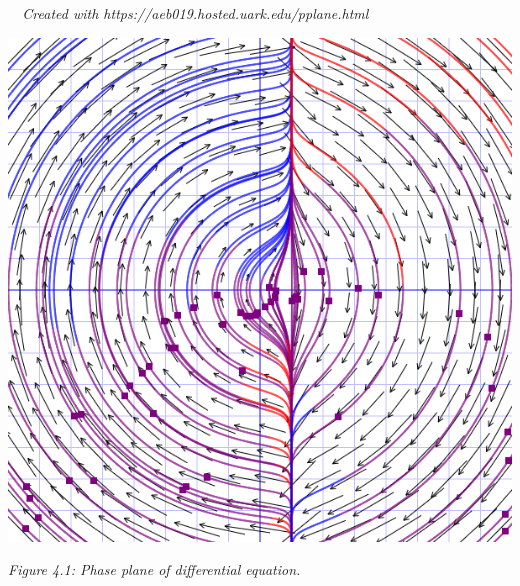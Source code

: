 \documentclass[11pt]{article}
\begin{document}
    \begin{problem}\textit{$\text{ }$ \newline Created with https://aeb019.hosted.uark.edu/pplane.html}
        \begin{center}
            \includegraphics[scale=0.3]{41.png}
        \end{center}
        \begin{center}
            \textit{Figure 4.1: Phase plane of differential equation.}
        \end{center}
    \end{problem}
\end{document}
